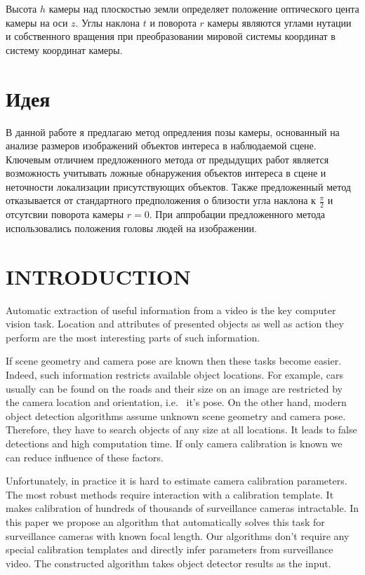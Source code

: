 Высота $h$ камеры над плоскостью земли определяет положение оптического цента камеры на оси $z$. Углы наклона $t$ и поворота $r$ камеры являются углами нутации и собственного вращения при преобразовании мировой системы координат в систему координат камеры.

\section{Идея}

В данной работе я предлагаю метод опредления позы камеры, основанный на анализе размеров изображений объектов интереса в наблюдаемой сцене. Ключевым отличием предложенного метода от предыдущих работ является возможность учитывать ложные обнаружения объектов интереса в сцене и неточности локализации присутствующих объектов. Также предложенный метод отказывается от стандартного предположения о близости угла наклона к 
$\frac{\pi}{2}$
и отсутсвии поворота камеры $r=0$. 
При аппробации предложенного метода использовались положения головы людей на изображении.

\section{\uppercase{Introduction}}
\label{sec:introduction}

\noindent Automatic extraction of useful information from a video is the key computer vision task. Location and attributes of presented objects as well as action they perform are the most interesting parts of such information.

If scene geometry and camera pose are known then these tasks become easier. Indeed, such information restricts available object locations. For example, cars usually can be found on the roads and their size on an image are restricted by the camera location and orientation, i.e.~ it's pose. On the other hand, modern object detection algorithms assume unknown scene geometry and camera pose. Therefore, they have to search objects of any size at all locations. It leads to false detections and high computation time. If only camera calibration is known we can reduce influence of these factors.

Unfortunately, in practice it is hard to estimate camera calibration parameters. The most robust methods require interaction with a calibration template. It makes calibration of hundreds of thousands of surveillance cameras intractable. In this paper we propose an algorithm that automatically solves this task for surveillance cameras with known focal length. Our algorithms don't require any special calibration templates and directly infer parameters from surveillance video. The constructed algorithm takes object detector results as the input.

